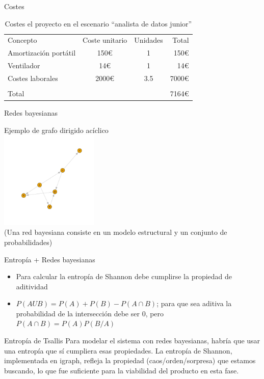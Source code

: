\documentclass{beamer}
\begin{document}
\begin{frame}{Costes}
	\begin{table}
		\begin{tabular}[h!tbp]{lccr}
		  Concepto & Coste unitario & Unidades & Total \\
		  Amortización portátil & 150€ & 1 & 150€ \\
		  Ventilador            & 14€  & 1 & 14€ \\
		  Costes laborales      & 2000€& 3.5 & 7000€ \\
		  \hline \\
		  \multicolumn{3}{l}{Total} & 7164€ \\
		\end{tabular}
		\caption{Costes el proyecto en el escenario ``analista de datos junior''} \label{tab:costes2}
		\end{table}
\end{frame}

\begin{frame}{Redes bayesianas}
	\begin{center}
		Ejemplo de grafo dirigido acíclico \\[12pt]
		\includegraphics[width=0.35\textwidth,keepaspectratio]{dag.png}
		\\
		\footnotesize(Una red bayesiana consiste en un modelo estructural y un conjunto de probabilidades)
    \end{center}
\end{frame}

\begin{frame}{Entropía + Redes bayesianas}
	\begin{itemize}
		\item Para calcular la entropía de Shannon debe cumplirse la propiedad de aditividad 
		\item $P(A U B) = P(A) + P(B) - P(A \cap B)$; para que sea aditiva la probabilidad de la intersección 
		debe ser 0, pero $P(A \cap B) = P(A)P(B/A)$
	\end{itemize}
	\begin{alertblock}{Entropía de Tsallis}
		Para modelar el sistema con redes bayesianas, habría que usar una entropía que sí 
		cumpliera esas propiedades.
		La entropía de Shannon, implementada en igraph, refleja la propiedad (caos/orden/sorpresa) que 
		estamos buscando, lo que fue suficiente para la viabilidad del producto en esta fase.
	\end{alertblock}
	
\end{frame}
\end{document}
